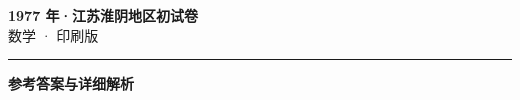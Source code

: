 \documentclass[zihao=5, a4paper]{ctexart}
\begin{document}
\begin{center}
  {\Large\bfseries 1977 年·江苏淮阴地区初试卷}\\[4pt]
  {\large 数学 · 印刷版}
\end{center}
\medskip
{}

\par\bigskip\hrule\bigskip
{}
\begin{center}{\large\bfseries 参考答案与详细解析}\end{center}
\smallskip

\end{document}
